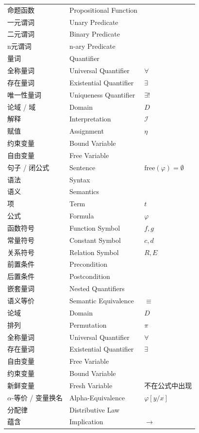 \documentclass[UTF8,11pt,a4paper]{ctexbook}   %
\theoremstyle{definition}
\begin{document}
\begin{longtable}{|p{4.8cm}|p{4.8cm}|p{4.8cm}|}
命题函数 & Propositional Function & \\
一元谓词 & Unary Predicate & \\
二元谓词 & Binary Predicate & \\
n元谓词 & n-ary Predicate & \\
量词 & Quantifier & \\
全称量词 & Universal Quantifier & $\forall$ \\
存在量词 & Existential Quantifier & $\exists$ \\
唯一性量词 & Uniqueness Quantifier & $\exists!$ \\
论域 / 域 & Domain & $D$ \\
解释 & Interpretation & $\mathcal{I}$ \\
赋值 & Assignment & $\eta$ \\
约束变量 & Bound Variable & \\
自由变量 & Free Variable & \\
句子 / 闭公式 & Sentence & $\mathrm{free}(\varphi)=\emptyset$ \\
语法 & Syntax & \\
语义 & Semantics & \\
项 & Term & $t$ \\
公式 & Formula & $\varphi$ \\
函数符号 & Function Symbol & $f, g$ \\
常量符号 & Constant Symbol & $c, d$ \\
关系符号 & Relation Symbol & $R, E$ \\
前置条件 & Precondition & \\
后置条件 & Postcondition & \\ \hline
嵌套量词 & Nested Quantifiers & \\
语义等价 & Semantic Equivalence & $\equiv$ \\
论域 & Domain & $D$ \\
排列 & Permutation & $\pi$ \\
全称量词 & Universal Quantifier & $\forall$ \\
存在量词 & Existential Quantifier & $\exists$ \\
自由变量 & Free Variable & \\
约束变量 & Bound Variable & \\
新鲜变量 & Fresh Variable & 不在公式中出现 \\
$\alpha$-等价 / 变量换名 & Alpha-Equivalence & $\varphi[y/x]$ \\
分配律 & Distributive Law & \\
蕴含 & Implication & $\to$ \\

\end{longtable}
\end{document}
